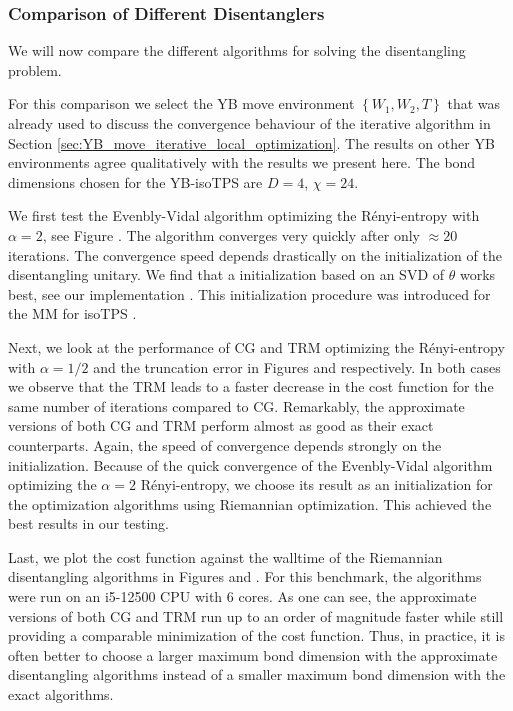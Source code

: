 \subsubsection*{\hspace{105pt}Comparison of Different Disentanglers}
We will now compare the different algorithms for solving the disentangling problem.


For this comparison we select the YB move environment $\left\{W_1, W_2, T\right\}$ that was already used to discuss the convergence behaviour of the iterative algorithm in Section \ref{sec:YB_move_iterative_local_optimization}. The results on other YB environments agree qualitatively with the results we present here. The bond dimensions chosen for the YB-isoTPS are $D = 4$, $\chi = 24$. \par
We first test the Evenbly-Vidal algorithm optimizing the Rényi-entropy with $\alpha = 2$, see Figure . The algorithm converges very quickly after only $\approx 20$ iterations. The convergence speed depends drastically on the initialization of the disentangling unitary. We find that a initialization based on an SVD of $\theta$ works best, see our implementation \cite{cite:github_YB_isoTPS}. This initialization procedure was introduced for the MM for isoTPS \cite{cite:isometric_tensor_network_states_in_two_dimensions, cite:efficient_simulation_of_dynamics_in_two_dimensional_quantum_spin_systems}. \par
Next, we look at the performance of CG and TRM optimizing the Rényi-entropy with $\alpha = 1/2$ and the truncation error in Figures  and  respectively. In both cases we observe that the TRM leads to a faster decrease in the cost function for the same number of iterations compared to CG. Remarkably, the approximate versions of both CG and TRM perform almost as good as their exact counterparts. Again, the speed of convergence depends strongly on the initialization. Because of the quick convergence of the Evenbly-Vidal algorithm optimizing the $\alpha = 2$ Rényi-entropy, we choose its result as an initialization for the optimization algorithms using Riemannian optimization. This achieved the best results in our testing. \par
Last, we plot the cost function against the walltime of the Riemannian disentangling algorithms in Figures  and . For this benchmark, the algorithms were run on an i5-12500 CPU with 6 cores. As one can see, the approximate versions of both CG and TRM run up to an order of magnitude faster while still providing a comparable minimization of the cost function. Thus, in practice, it is often better to choose a larger maximum bond dimension with the approximate disentangling algorithms instead of a smaller maximum bond dimension with the exact algorithms.
